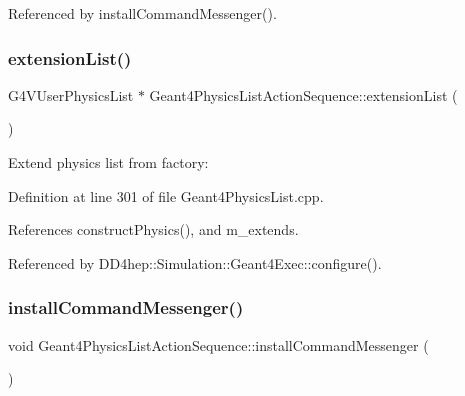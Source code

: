 Referenced by install\+Command\+Messenger().

\hypertarget{class_d_d4hep_1_1_simulation_1_1_geant4_physics_list_action_sequence_a51078548bbd59fa3cb1447d2b2c6e2fb}{}\label{class_d_d4hep_1_1_simulation_1_1_geant4_physics_list_action_sequence_a51078548bbd59fa3cb1447d2b2c6e2fb} 
\subsubsection{\texorpdfstring{extension\+List()}{extensionList()}}
{\footnotesize\ttfamily G4\+V\+User\+Physics\+List $\ast$ Geant4\+Physics\+List\+Action\+Sequence\+::extension\+List (\begin{DoxyParamCaption}{ }\end{DoxyParamCaption})}



Extend physics list from factory\+: 



Definition at line 301 of file Geant4\+Physics\+List.\+cpp.



References construct\+Physics(), and m\+\_\+extends.



Referenced by D\+D4hep\+::\+Simulation\+::\+Geant4\+Exec\+::configure().

\hypertarget{class_d_d4hep_1_1_simulation_1_1_geant4_physics_list_action_sequence_a9c60c66de8a46726b0b3d781042c22a6}{}\label{class_d_d4hep_1_1_simulation_1_1_geant4_physics_list_action_sequence_a9c60c66de8a46726b0b3d781042c22a6} 
\subsubsection{\texorpdfstring{install\+Command\+Messenger()}{installCommandMessenger()}}
{\footnotesize\ttfamily void Geant4\+Physics\+List\+Action\+Sequence\+::install\+Command\+Messenger (\begin{DoxyParamCaption}{ }\end{DoxyParamCaption})\hspace{0.3cm}{\ttfamily [virtual]}}




